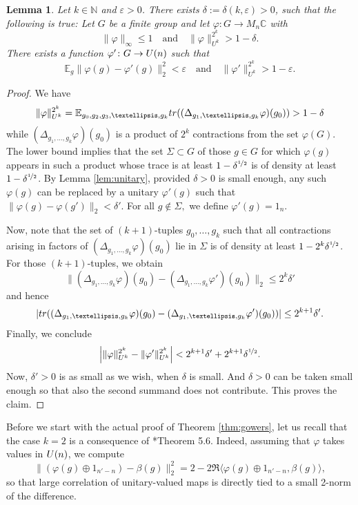 \documentclass[a4paper,11pt]{amsproc}
\theoremstyle{plain}
\newtheorem{lemma}[theorem]{Lemma}
\theoremstyle{definition}
\begin{document}
\begin{lemma} Let $k \in \mathbb N$ and $\varepsilon>0$. There exists $\delta:=\delta(k,\varepsilon)>0$, such that the following is true: Let $G$ be a finite group and let $\varphi \colon G \to M_n \mathbb C$ with
$$\|\varphi\|_{\infty} \leq 1 \quad \mbox{and} \quad \|\varphi\|^{2^k}_{U^k} > 1 -\delta.$$
There exists a function $\varphi' \colon G \to {\rm U}(n)$ such that
$$\mathbb E_g \|\varphi(g) - \varphi'(g)\|^2_2 < \varepsilon \quad \mbox{and} \quad \|\varphi'\|^{2^k}_{U^k} > 1 -\varepsilon.$$
\end{lemma}
\begin{proof} We have 
$$\|\varphi\|^{2^{k}}_{U^k} = \mathbb E_{g_0,g_2,g_3,\dots,g_{k}} {\rm tr}((\Delta_{g_1,\dots,g_k}\varphi)(g_{0})) > 1 -\delta$$ while $(\Delta_{g_1,\dots,g_k}\varphi)(g_{0})$ is a product of $2^k$ contractions from the set $\varphi(G)$. The lower bound implies that the set $\Sigma \subset G$ of those $g \in G$ for which $\varphi(g)$ appears in such a product whose trace is at least $1 -\delta^{\nicefrac12}$ is of density at least $1 -\delta^{\nicefrac12}$. By Lemma \ref{lem:unitary}, provided $\delta>0$ is small enough, any such $\varphi(g)$ can be replaced by a unitary $\varphi'(g)$ such that $\|\varphi(g)-\varphi(g')\|_2< \delta'.$ For all $g \not \in \Sigma,$ we define $\varphi'(g)=1_n.$

Now, note that the set of $(k+1)$-tuples $g_0,\dots,g_k$ such that all contractions arising in factors of $(\Delta_{g_1,\dots,g_k}\varphi)(g_{0})$ lie in $\Sigma$ is of density at least $1-2^k\delta^{\nicefrac12}$. For those $(k+1)$-tuples, we obtain
$$\|(\Delta_{g_1,\dots,g_k}\varphi)(g_{0}) - (\Delta_{g_1,\dots,g_k}\varphi')(g_{0})\|_2 \leq 2^k \delta'$$
and hence
$$|{\rm tr}((\Delta_{g_1,\dots,g_k}\varphi)(g_{0}) - (\Delta_{g_1,\dots,g_k}\varphi')(g_{0}))| \leq 2^{k+1} \delta'.$$
Finally, we conclude
$$\left| \|\varphi\|_{U^k}^{2^k} - \|\varphi'\|^{2^k}_{U^k} \right| < 2^{k+1} \delta' + 2^{k+1}\delta^{\nicefrac12}.$$
Now, $\delta'>0$ is as small as we wish, when $\delta$ is small. And $\delta>0$ can be taken small enough so that also the second summand does not contribute. This proves the claim.
\end{proof}

Before we start with the actual proof of Theorem \ref{thm:gowers}, let us recall that the case $k=2$ is a consequence of \cite{MR3733361}*{Theorem 5.6}. Indeed, assuming that $\varphi$ takes values in ${\rm U}(n)$, we compute
$$\|(\varphi(g) \oplus 1_{n'-n}) - \beta(g)\|^2_2 = 2 - 2 \Re \langle \varphi(g) \oplus 1_{n'-n}, \beta(g) \rangle,$$
so that large correlation of unitary-valued maps is directly tied to a small 2-norm of the difference.
\end{document}
